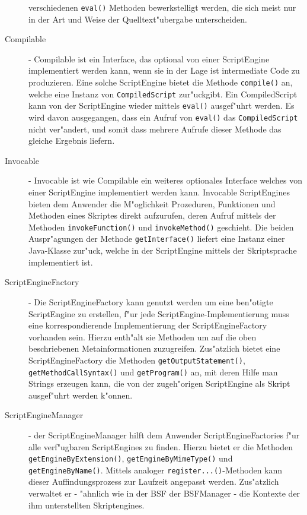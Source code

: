 \begin{description}
    verschiedenen \texttt{eval()} Methoden bewerkstelligt werden, die sich meist nur in der Art und Weise der Quelltext"ubergabe
    unterscheiden.
    \item[Compilable] - Compilable ist ein Interface, das optional von einer ScriptEngine implementiert werden kann, wenn sie in der Lage
    ist intermediate Code zu produzieren. Eine solche ScriptEngine bietet die Methode \texttt{compile()} an, welche eine Instanz
    von \texttt{CompiledScript} zur"uckgibt. Ein CompiledScript kann von der ScriptEngine wieder mittels \texttt{eval()} ausgef"uhrt werden.
    Es wird davon ausgegangen, dass ein Aufruf von \texttt{eval()} das \texttt{CompiledScript} nicht ver"andert, und somit dass mehrere
    Aufrufe dieser Methode das gleiche Ergebnis liefern.
    \item[Invocable] - Invocable ist wie Compilable ein weiteres optionales Interface welches von einer ScriptEngine implementiert
    werden kann. Invocable ScriptEngines bieten dem Anwender die M"oglichkeit Prozeduren, Funktionen und Methoden eines Skriptes 
    direkt aufzurufen, deren Aufruf mittels der Methoden \texttt{invokeFunction()} und \texttt{invokeMethod()} geschieht.
    Die beiden Auspr"agungen der Methode \texttt{getInterface()} liefert eine Instanz einer Java-Klasse zur"uck, welche in der ScriptEngine mittels
    der Skriptsprache implementiert ist.
    \item[ScriptEngineFactory] - Die ScriptEngineFactory kann genutzt werden um eine ben"otigte ScriptEngine zu erstellen,
    f"ur jede ScriptEngine-Implementierung muss eine korrespondierende Implementierung der ScriptEngineFactory vorhanden sein.
    Hierzu enth"alt sie Methoden um auf die oben beschriebenen Metainformationen zuzugreifen. Zus"atzlich bietet eine ScriptEngineFactory
    die Methoden \texttt{getOutputStatement()}, \texttt{getMethodCallSyntax()} und \texttt{getProgram()} an, mit deren Hilfe
    man Strings erzeugen kann, die von der zugeh"origen ScriptEngine als Skript ausgef"uhrt werden k"onnen.
    \item[ScriptEngineManager] - der ScriptEngineManager hilft dem Anwender ScriptEngineFactories f"ur alle verf"ugbaren
    ScriptEngines zu finden. Hierzu bietet er die Methoden \texttt{getEngineByExtension()}, \texttt{getEngineByMimeType()} und
    \texttt{getEngineByName()}. Mittels analoger \texttt{register...()}-Methoden kann dieser Auffindungsprozess zur Laufzeit
    angepasst werden.
    Zus"atzlich verwaltet er - "ahnlich wie in der BSF der BSFManager - die Kontexte der ihm unterstellten Skriptengines.
\end{description}


